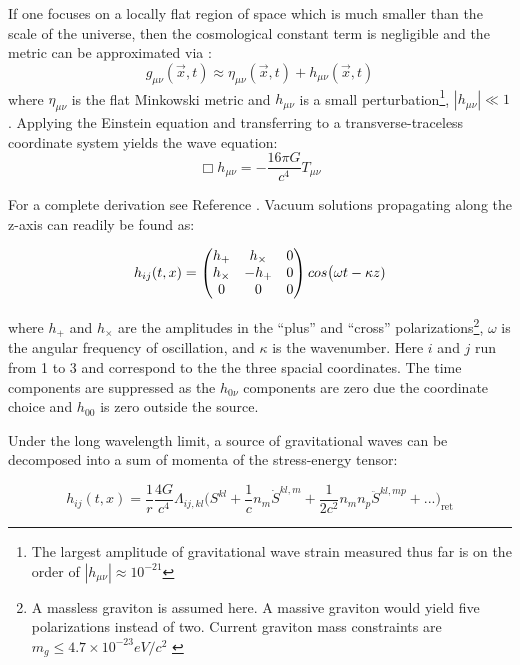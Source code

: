 \documentclass [12pt, proquest]{uwthesis}[2019]
\begin{document}
If one focuses on a locally flat region of space which is much smaller than the scale of the universe, then the cosmological constant term is negligible and the metric can be approximated via \cite{GWBook}:
\begin{equation}
g_{\mu \nu}(\vec x,t)\approx\eta_{\mu \nu}(\vec x,t)+h_{\mu \nu}(\vec x,t)
\end{equation}
where $\eta_{\mu \nu}$ is the flat Minkowski metric and $h_{\mu \nu}$ is a small perturbation\footnote{The largest amplitude of gravitational wave strain measured thus far is on the order of $|h_{\mu \nu}|\approx 10^{-21}$\cite{GW150914}}, $|h_{\mu \nu}|\ll 1$. Applying the Einstein equation and transferring to a transverse-traceless coordinate system yields the wave equation:
\begin{equation}
\Box h_{\mu \nu}=-\frac{16 \pi G}{c^4}T_{\mu \nu}
\end{equation}

For a complete derivation see Reference \cite{GWBook}. Vacuum solutions propagating along the z-axis can readily be found as:

\begin{equation}
h_{ij}(t,x)=\begin{pmatrix} h_+ & h_\times & 0 \\ h_\times & -h_+ & 0 \\ 0 & 0 & 0\end{pmatrix} \\cos\big(\omega t - \kappa z)
\end{equation}

where $h_+$ and $h_\times$ are the amplitudes in the ``plus'' and ``cross'' polarizations\footnote{A massless graviton is assumed here. A massive graviton would yield five polarizations instead of two. Current graviton mass constraints are $m_g\leq 4.7\times 10^{-23} eV/c^2$ \cite{graviton}}, $\omega$ is the angular frequency of oscillation, and $\kappa$ is the wavenumber. Here $i$ and $j$ run from 1 to 3 and correspond to the the three spacial coordinates. The time components are suppressed as the $h_{0\nu}$ components are zero due the coordinate choice and $h_{00}$ is zero outside the source. 

Under the long wavelength limit, a source of gravitational waves can be decomposed into a sum of momenta of the stress-energy tensor:

\begin{equation}
h_{ij}(t,x)=\frac{1}{r}\frac{4 G}{c^4} \Lambda_{ij,kl} \bigg( S^{kl} +\frac{1}{c} n_m \dot{S}^{kl,m} +\frac{1}{2c^2} n_m n_p \ddot{S}^{kl,mp}+...\bigg)_\text{ret} \label{gwExp}
\end{equation}
\end{document}
